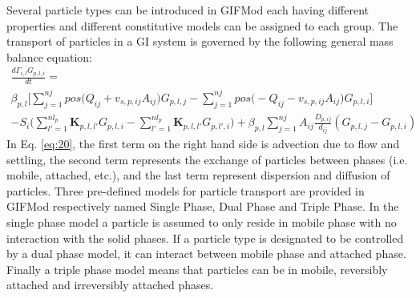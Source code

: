 Several particle types can be introduced in GIFMod each having different properties and different constitutive models can be assigned to each group. The transport of particles in a GI system is governed by the following general mass balance equation: 
\begin{equation}
\label{eq:20}
\begin{split}
\frac{d\Gamma_{i,l} G_{p,l,i}}{dt} =\\ \beta_{p,l} \bigg[\sum_{j=1}^{nj} pos \big(Q_{ij}+v_{s,p,ij}A_{ij}\big)G_{p,l,j}-\sum_{j=1}^{nj} pos \big(-Q_{ij}-v_{s,p,ij}A_{ij}\big)G_{p,l,i}\bigg]\\
-S_i \big(\sum_{l'=1}^{nl_p}\textbf{K}_{p,l,l'}G_{p,l,i}-\sum_{l'=1}^{nl_p}\textbf{K}_{p,l,l'}G_{p,l',i}\big) + \beta_{p,l} \sum_{j=1}^{nj} A_{ij}\frac{D_{p,ij}}{d_{ij}}(G_{p,l,j}-G_{p,l,i})
\end{split}
\end{equation}
In Eq. \ref{eq:20}, the first term on the right hand side is advection due to flow and settling, the second term represents the exchange of particles between phases (i.e. mobile, attached, etc.), and the last term represent dispersion and diffusion of particles. 
Three pre-defined models for particle transport are provided in GIFMod respectively named Single Phase, Dual Phase and Triple Phase. In the single phase model a particle is assumed to only reside in mobile phase with no interaction with the solid phases. If a particle type is designated to be controlled by a dual phase model, it can interact between mobile phase and attached phase. Finally a triple phase model means that particles can be in mobile, reversibly attached and irreversibly attached phases. 
